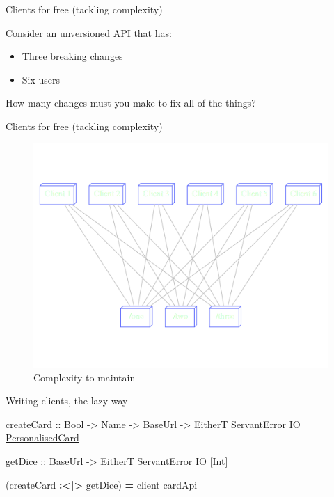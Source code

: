 \documentclass[ignorenonframetext,]{beamer}
\newenvironment{Shaded}{}{}
\newcommand{\DataTypeTok}[1]{\underline{{#1}}}
\newcommand{\OtherTok}[1]{{#1}}
\newcommand{\FunctionTok}[1]{\textcolor[rgb]{1.00,0.58,0.35}{\textbf{{#1}}}}
\newcommand{\NormalTok}[1]{{#1}}
\begin{document}
\begin{frame}{Clients for free (tackling complexity)}

Consider an unversioned API that has:

\begin{itemize}[<+->]
\itemsep1pt\parskip0pt
\item
  Three breaking changes
\item
  Six users
\end{itemize}

How many changes must you make to fix all of the things?

\end{frame}

\begin{frame}{Clients for free (tackling complexity)}

\begin{figure}[htbp]
\centering
\includegraphics{square.png}
\caption{Complexity to maintain}
\end{figure}

\end{frame}

\begin{frame}[fragile]{Writing clients, the lazy way}

\begin{Shaded}
\begin{Highlighting}[]
\NormalTok{createCard}
\OtherTok{    ::} \DataTypeTok{Bool}
    \OtherTok{->} \DataTypeTok{Name}
    \OtherTok{->} \DataTypeTok{BaseUrl}
    \OtherTok{->} \DataTypeTok{EitherT} \DataTypeTok{ServantError} \DataTypeTok{IO} \DataTypeTok{PersonalisedCard}

\NormalTok{getDice}
\OtherTok{    ::} \DataTypeTok{BaseUrl}
    \OtherTok{->} \DataTypeTok{EitherT} \DataTypeTok{ServantError} \DataTypeTok{IO} \NormalTok{[}\DataTypeTok{Int}\NormalTok{]}

\NormalTok{(createCard }\FunctionTok{:<|>} \NormalTok{getDice) }\FunctionTok{=} \NormalTok{client cardApi}
\end{Highlighting}
\end{Shaded}

\end{frame}
\end{document}
